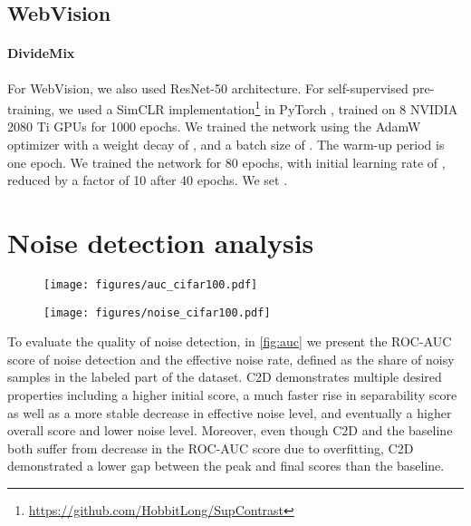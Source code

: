 \documentclass[10pt,twocolumn,letterpaper]{article}
\renewcommand{\cite}[1]{\citep{#1}}
\begin{document}
\subsection{WebVision}

\paragraph{DivideMix}
For WebVision, we also used ResNet-50 architecture.
For self-supervised pre-training, we used a SimCLR implementation\footnote{\url{https://github.com/HobbitLong/SupContrast}} in PyTorch \cite{paszke2019pytorch}, trained on 8 NVIDIA 2080 Ti GPUs for 1000 epochs.
We trained the network using the AdamW optimizer \cite{loshchilov2017decoupled} with a weight decay of , and a batch size of . The warm-up period is one epoch. We trained the network for 80 epochs, with initial learning rate of , reduced by a factor of 10 after 40 epochs.
We set . 


\section{Noise detection analysis}


\begin{figure*}
\centering
    \begin{subfigure}{0.49\linewidth}
        \texttt{[image: figures/auc\_cifar100.pdf]}
    \end{subfigure}
    \begin{subfigure}{0.49\linewidth}
        \texttt{[image: figures/noise\_cifar100.pdf]}
    \end{subfigure}
 \caption{Training time ROC-AUC scores (left) and effective noise rates (right). C2D demonstrates higher initial score, faster rise, and more stable decrease in effective noise level.}
\label{fig:auc}
\end{figure*}


To evaluate the quality of noise detection, in \cref{fig:auc} we present the ROC-AUC score of noise detection and the effective noise rate, defined as the share of noisy samples in the labeled part of the dataset. C2D demonstrates multiple desired properties including a higher initial score, a much faster rise in separability score as well as a more stable decrease in effective noise level, and eventually a higher overall score and lower noise level. Moreover, even though C2D and the baseline both suffer from decrease in the ROC-AUC score due to overfitting, C2D demonstrated a lower gap between the peak and final scores than the baseline.

 
\end{document}

